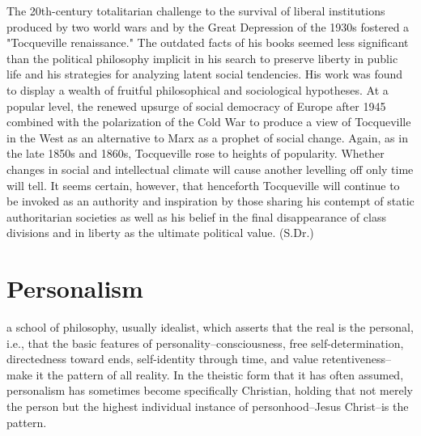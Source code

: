 \documentclass[12pt]{article}
\begin{document}
                                      The 20th-century totalitarian challenge to the survival of liberal
                                      institutions produced by two world wars and by the Great Depression
                                      of the 1930s fostered a "Tocqueville renaissance." The outdated facts
                                      of his books seemed less significant than the political philosophy
                                      implicit in his search to preserve liberty in public life and his
                                      strategies for analyzing latent social tendencies. His work was found
                                      to display a wealth of fruitful philosophical and sociological
                                      hypotheses. At a popular level, the renewed upsurge of social
                                      democracy of Europe after 1945 combined with the polarization of the
                                      Cold War to produce a view of Tocqueville in the West as an
                                      alternative to Marx as a prophet of social change. Again, as in the late
                                      1850s and 1860s, Tocqueville rose to heights of popularity. Whether
                                      changes in social and intellectual climate will cause another
                                      levelling off only time will tell. It seems certain, however, that
                                      henceforth Tocqueville will continue to be invoked as an authority and
                                      inspiration by those sharing his contempt of static authoritarian
                                      societies as well as his belief in the final disappearance of class
                                      divisions and in liberty as the ultimate political value. (S.Dr.) 





\section{Personalism}
a school of philosophy, usually idealist, which asserts that the real is
                                      the personal, i.e., that the basic features of
                                      personality--consciousness, free self-determination, directedness
                                      toward ends, self-identity through time, and value
                                      retentiveness--make it the pattern of all reality. In the theistic form
                                      that it has often assumed, personalism has sometimes become
                                      specifically Christian, holding that not merely the person but the
                                      highest individual instance of personhood--Jesus Christ--is the
                                      pattern. 
\end{document}
